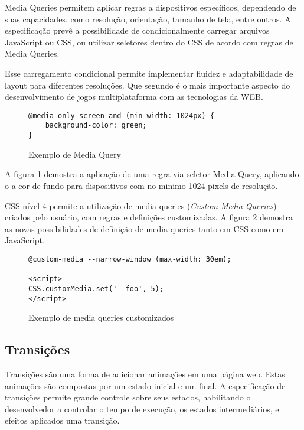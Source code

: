 Media Queries permitem aplicar regras a dispositivos específicos,
dependendo de suas capacidades, como resolução, orientação, tamanho
de tela, entre outros. A especificação prevê a possibilidade de
condicionalmente carregar arquivos JavaScript ou CSS, ou utilizar
seletores dentro do CSS de acordo com regras de Media Queries.

Esse carregamento condicional  permite implementar fluidez e
adaptabilidade de layout para diferentes resoluções. Que segundo
\cite{HTML5CrossPlatformGameDevelopment} é o mais importante aspecto do
desenvolvimento de jogos multiplataforma com as tecnologias da WEB.

\begin{figure}[H]
\centering
\begin{verbatim}
@media only screen and (min-width: 1024px) {
    background-color: green;
}
\end{verbatim}
\caption{Exemplo de Media Query}
\label{fig:MediaQuery}
\end{figure}

A figura \ref{fig:MediaQuery} demostra a aplicação de uma regra via
seletor Media Query, aplicando o a cor de fundo para dispositivos com no
minimo 1024 pixels de resolução.

CSS nível 4 permite a utilização de media queries (\textit{Custom
Media Queries}) criados pelo usuário, com regras e definições
customizadas. A figura \ref{fig:MediaQueryCustom} demostra as novas
possibilidades de definição de media queries tanto em CSS como em
JavaScript.

\begin{figure}[H]
\centering
\begin{verbatim}
@custom-media --narrow-window (max-width: 30em);

<script>
CSS.customMedia.set('--foo', 5);
</script>

\end{verbatim}
\caption{Exemplo de media queries customizados}
\label{fig:MediaQueryCustom}
\end{figure}


\subsection{Transições}

Transições são uma forma de adicionar animações em uma página
web. Estas animações são compostas por um estado inicial e um final.
A especificação de transições permite grande controle sobre seus
estados, habilitando o desenvolvedor a controlar o tempo de execução,
os estados intermediários, e efeitos aplicados uma transição.

